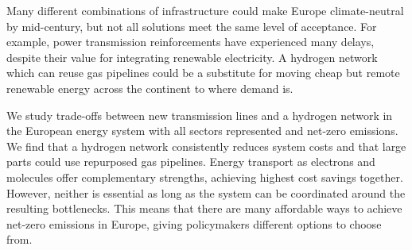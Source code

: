 
Many different combinations of infrastructure could make Europe climate-neutral
by mid-century, but not all solutions meet the same level of acceptance. For
example, power transmission reinforcements have experienced many delays, despite their
value for integrating renewable electricity. A hydrogen network which can reuse
gas pipelines could be a substitute for moving cheap but remote renewable
energy across the continent to where demand is.

We study trade-offs between new transmission lines and a hydrogen network in the
European energy system with all sectors represented and net-zero \co emissions.
We find that a hydrogen network consistently reduces system costs and that large
parts could use repurposed gas pipelines. Energy transport as electrons and
molecules offer complementary strengths, achieving highest cost savings
together. However, neither is essential as long as the system can be coordinated
around the resulting bottlenecks. This means that there are many affordable ways
to achieve net-zero emissions in Europe, giving policymakers different options
to choose from.
